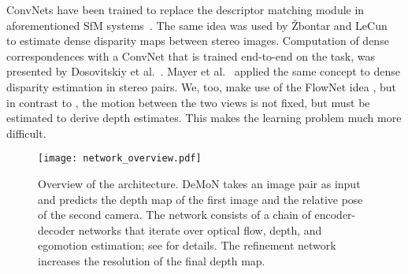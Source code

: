 \documentclass[10pt,twocolumn,letterpaper]{article}
\begin{document}
ConvNets have been trained to replace the descriptor matching module in aforementioned SfM systems~\cite{Exemplar_CNN_PAMI, zagoruyko_2015}.
The same idea was used by {\v{Z}}bontar and LeCun~\cite{zbontar_computing_2015} to estimate dense disparity maps between stereo images. 
Computation of dense correspondences with a ConvNet that is trained end-to-end on the task, was presented by Dosovitskiy et al.~\cite{dosovitskiy_flownet_2015}. Mayer et al.~\cite{mayer_sceneflownet_2016} applied the same concept to dense disparity estimation in stereo pairs.
We, too, make use of the FlowNet idea \cite{dosovitskiy_flownet_2015}, but in contrast to \cite{mayer_sceneflownet_2016,zbontar_computing_2015}, the motion between the two views is not fixed, but must be estimated to derive depth estimates.
This makes the learning problem much more difficult. 
\begin{figure*}
\begin{center}
\texttt{[image: network\_overview.pdf]}
\end{center}
\vspace{-0.9em}%
\vspace{\capvspace}%
\caption{%
Overview of the architecture. DeMoN takes an image pair as input and predicts the depth map of the first image and the relative pose of the second camera. The network consists of a chain of encoder-decoder networks that iterate over optical flow, depth, and egomotion estimation; see  for details. The refinement network increases the resolution of the final depth map.
}
\label{fig:network_overview}
\end{figure*}
\end{document}
